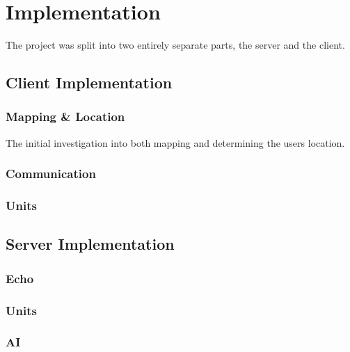 \chapter{Implementation}
The project was split into two entirely separate parts, the server and the client. 




\section{Client Implementation}


\subsection{Mapping \& Location}
The initial investigation into both mapping and determining the users location. 


\subsection{Communication}



\subsection{Units}



\section{Server Implementation}


\subsection{Echo}

\subsection{Units}

\subsection{AI}
